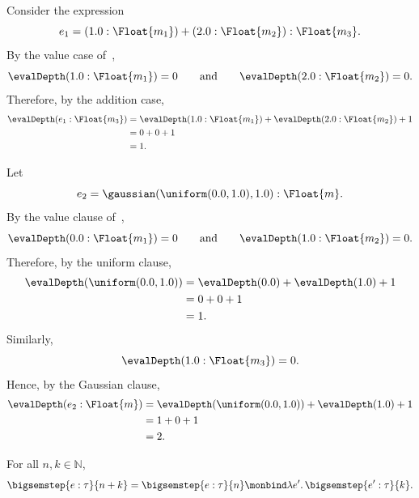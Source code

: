 \begin{example}
  Consider the expression
  \[
    e_1
    =
    (1.0 : \Float{m_1}) + (2.0 : \Float{m_2})
    :
    \Float{m_3}.
  \]
  By the value case of~,
  \[
    \evalDepth(1.0 : \Float{m_1}) = 0
    \qquad\text{and}\qquad
    \evalDepth(2.0 : \Float{m_2}) = 0.
  \]
  Therefore, by the addition case,
  \[
  \begin{aligned}
    \evalDepth(e_1 : \Float{m_3})
    &=
    \evalDepth(1.0 : \Float{m_1})
    +
    \evalDepth(2.0 : \Float{m_2})
    +
    1 \\
    &= 0 + 0 + 1 \\
    &= 1.
  \end{aligned}
  \]
\end{example}

\begin{example}
  Let
  \[
    e_2 =
    \gaussian(\uniform(0.0,1.0),1.0) : \Float{m}.
  \]
  By the value clause of~,
  \[
    \evalDepth(0.0 : \Float{m_1}) = 0
    \qquad\text{and}\qquad
    \evalDepth(1.0 : \Float{m_2}) = 0.
  \]
  Therefore, by the uniform clause,
  \[
  \begin{aligned}
    \evalDepth(\uniform(0.0,1.0))
    &=
    \evalDepth(0.0)
    +
    \evalDepth(1.0)
    +
    1 \\
    &= 0 + 0 + 1 \\
    &= 1.
  \end{aligned}
  \]
  Similarly,
  \[
    \evalDepth(1.0 : \Float{m_3}) = 0.
  \]
  Hence, by the Gaussian clause,
  \[
  \begin{aligned}
    \evalDepth(e_2 : \Float{m})
    &=
    \evalDepth(\uniform(0.0,1.0))
    +
    \evalDepth(1.0)
    +
    1 \\
    &= 1 + 0 + 1 \\
    &= 2.
  \end{aligned}
  \]
\end{example}



\begin{lemma}\label{lem:nstep-composition}
  For all $n,k \in \mathbb{N}$,
  \[
    \bigsemstep{e : \tau}{n+k}
    =
    \bigsemstep{e : \tau}{n}
    \monbind
    \lambda e'.\,\bigsemstep{e' : \tau}{k}.
  \]
\end{lemma}

